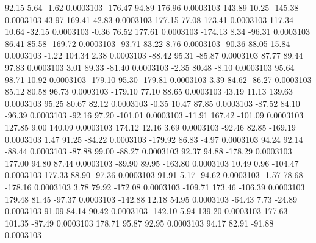        92.15        5.64       -1.62     0.0003103
     -176.47       94.89      176.96     0.0003103
      143.89       10.25     -145.38     0.0003103
       43.97      169.41       42.83     0.0003103
      177.15       77.08      173.41     0.0003103
      117.34       10.64      -32.15     0.0003103
       -0.36       76.52      177.61     0.0003103
     -174.13        8.34      -96.31     0.0003103
       86.41       85.58     -169.72     0.0003103
      -93.71       83.22        8.76     0.0003103
      -90.36       88.05       15.84     0.0003103
       -1.22      104.34        2.38     0.0003103
      -88.42       95.31      -85.87     0.0003103
       87.77       89.44       97.83     0.0003103
        3.01       89.33      -81.40     0.0003103
       -2.35       80.48       -8.10     0.0003103
       95.64       98.71       10.92     0.0003103
     -179.10       95.30     -179.81     0.0003103
        3.39       84.62      -86.27     0.0003103
       85.12       80.58       96.73     0.0003103
     -179.10       77.10       88.65     0.0003103
       43.19       11.13      139.63     0.0003103
       95.25       80.67       82.12     0.0003103
       -0.35       10.47       87.85     0.0003103
      -87.52       84.10      -96.39     0.0003103
      -92.16       97.20     -101.01     0.0003103
      -11.91      167.42     -101.09     0.0003103
      127.85        9.00      140.09     0.0003103
      174.12       12.16        3.69     0.0003103
      -92.46       82.85     -169.19     0.0003103
        1.47       91.25      -84.22     0.0003103
     -179.92       86.83       -4.97     0.0003103
       94.24       92.14      -88.44     0.0003103
      -87.88       99.00      -88.27     0.0003103
       92.37       94.88     -178.29     0.0003103
      177.00       94.80       87.44     0.0003103
      -89.90       89.95     -163.80     0.0003103
       10.49        0.96     -104.47     0.0003103
      177.33       88.90      -97.36     0.0003103
       91.91        5.17      -94.62     0.0003103
       -1.57       78.68     -178.16     0.0003103
        3.78       79.92     -172.08     0.0003103
     -109.71      173.46     -106.39     0.0003103
      179.48       81.45      -97.37     0.0003103
     -142.88       12.18       54.95     0.0003103
      -64.43        7.73      -24.89     0.0003103
       91.09       84.14       90.42     0.0003103
     -142.10        5.94      139.20     0.0003103
      177.63      101.35      -87.49     0.0003103
      178.71       95.87       92.95     0.0003103
       94.17       82.91      -91.88     0.0003103
